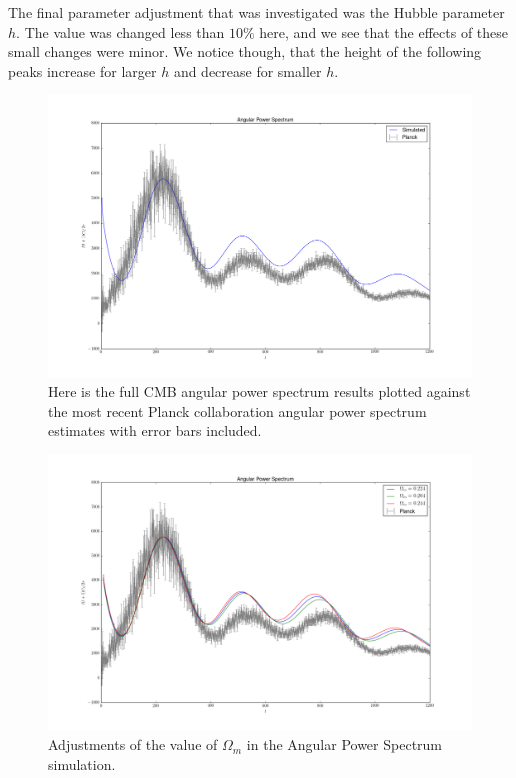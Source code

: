 \documentclass[a4paper]{article}
\begin{document}
The final parameter adjustment that was investigated was the Hubble parameter $h$. The value was changed less than $10\%$ here, and we see that the effects of these small changes were minor. We notice though, that the height of the following peaks increase for larger $h$ and decrease for smaller $h$.

\begin{figure}[ht]\label{fig:sim}
\centering
\includegraphics[width=\linewidth]{C_l_simulated}
\caption{Here is the full CMB angular power spectrum results plotted against the most recent Planck collaboration angular power spectrum estimates with error bars included.}
\end{figure}

\begin{figure}[ht]\label{fig:omegm}
\centering
\includegraphics[width=\linewidth]{C_l_omega_m}
\caption{Adjustments of the value of $\Omega_m$ in the Angular Power Spectrum simulation.}
\end{figure}
\end{document}

